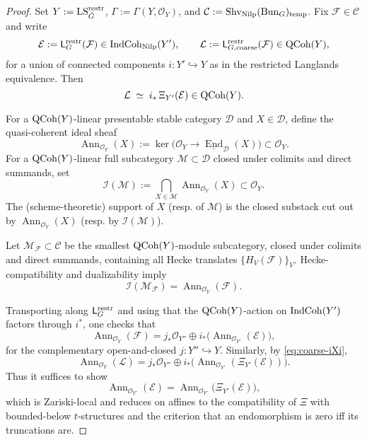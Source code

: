 \begin{proof}
Set $Y:=\mathrm{LS}^{\mathrm{restr}}_{\check G}$, $\Gamma:=\Gamma(Y,\mathcal O_Y)$, and $\mathcal C:=\mathrm{Shv}_{\mathrm{Nilp}}(\mathrm{Bun}_G)_{\mathrm{temp}}$. Fix $\mathcal F\in\mathcal C$ and write
\[
\mathcal E:=\mathsf L^{\mathrm{restr}}_G(\mathcal F)\in\mathrm{IndCoh}_{\mathrm{Nilp}}(Y'),\qquad
\mathcal L:=\mathsf L^{\mathrm{restr}}_{G,\mathrm{coarse}}(\mathcal F)\in\mathrm{QCoh}(Y),
\]
for a union of connected components $i:Y'\hookrightarrow Y$ as in the restricted Langlands equivalence. Then
\begin{equation}\label{eq:coarse-iXi}
\mathcal L\;\simeq\;i_*\,\Xi_{Y'}(\mathcal E)\in\mathrm{QCoh}(Y).
\end{equation}

For a $\mathrm{QCoh}(Y)$-linear presentable stable category $\mathcal D$ and $X\in\mathcal D$, define the quasi-coherent ideal sheaf
\[
\operatorname{Ann}_{\mathcal O_Y}(X):=\ker\bigl(\mathcal O_Y\to\underline{\operatorname{End}}_{\mathcal D}(X)\bigr)\subset\mathcal O_Y.
\]
For a $\mathrm{QCoh}(Y)$-linear full subcategory $\mathcal M\subset\mathcal D$ closed under colimits and direct summands, set
\[
\mathcal I(\mathcal M):=\bigcap_{X\in\mathcal M}\operatorname{Ann}_{\mathcal O_Y}(X)\subset\mathcal O_Y.
\]
The (scheme-theoretic) support of $X$ (resp. of $\mathcal M$) is the closed substack cut out by $\operatorname{Ann}_{\mathcal O_Y}(X)$ (resp. by $\mathcal I(\mathcal M)$).

Let $\mathcal M_{\mathcal F}\subset\mathcal C$ be the smallest $\mathrm{QCoh}(Y)$-module subcategory, closed under colimits and direct summands, containing all Hecke translates $\{H_V(\mathcal F)\}_V$. Hecke-compatibility and dualizability imply
\[
\mathcal I(\mathcal M_{\mathcal F})=\operatorname{Ann}_{\mathcal O_Y}(\mathcal F).
\]

Transporting along $\mathsf L^{\mathrm{restr}}_G$ and using that the $\mathrm{QCoh}(Y)$-action on $\mathrm{IndCoh}(Y')$ factors through $i^*$, one checks that
\begin{equation}\label{eq:ann-on-Y-via-Yprime}
\operatorname{Ann}_{\mathcal O_Y}(\mathcal F)=j_*\mathcal O_{Y''}\oplus i_*\bigl(\operatorname{Ann}_{\mathcal O_{Y'}}(\mathcal E)\bigr),
\end{equation}
for the complementary open-and-closed $j:Y''\hookrightarrow Y$. Similarly, by \eqref{eq:coarse-iXi},
\begin{equation}\label{eq:ann-coarse-on-Y}
\operatorname{Ann}_{\mathcal O_Y}(\mathcal L)=j_*\mathcal O_{Y''}\oplus i_*\bigl(\operatorname{Ann}_{\mathcal O_{Y'}}(\Xi_{Y'}(\mathcal E))\bigr).
\end{equation}
Thus it suffices to show
\[
\operatorname{Ann}_{\mathcal O_{Y'}}(\mathcal E)=\operatorname{Ann}_{\mathcal O_{Y'}}\bigl(\Xi_{Y'}(\mathcal E)\bigr),
\]
which is Zariski-local and reduces on affines to the compatibility of $\Xi$ with bounded-below $t$-structures and the criterion that an endomorphism is zero iff its truncations are.


\end{proof}
